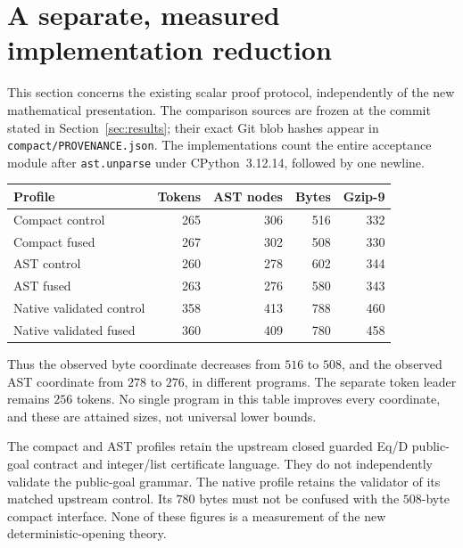 \section{A separate, measured implementation reduction}
\label{sec:continuation-fusion}

This section concerns the existing scalar proof protocol, independently of
the new mathematical presentation. The comparison sources are frozen at
the commit stated in Section~\ref{sec:results}; their exact Git blob hashes
appear in \texttt{compact/PROVENANCE.json}.
The implementations count the entire acceptance module after
\texttt{ast.unparse} under CPython~3.12.14, followed by one newline.

\begin{center}
\begin{tabular}{lrrrr}
\hline
Profile & Tokens & AST nodes & Bytes & Gzip-9\\
\hline
Compact control &265&306&516&332\\
Compact fused &267&302&508&330\\
AST control &260&278&602&344\\
AST fused &263&276&580&343\\
Native validated control &358&413&788&460\\
Native validated fused &360&409&780&458\\
\hline
\end{tabular}
\end{center}

Thus the observed byte coordinate decreases from $516$ to $508$, and the
observed AST coordinate from $278$ to $276$, in different programs. The
separate token leader remains $256$ tokens. No single program in this table
improves every coordinate, and these are attained sizes, not universal
lower bounds.

The compact and AST profiles retain the upstream closed guarded Eq/D
public-goal contract and integer/list certificate language. They do not
independently validate the public-goal grammar. The native profile retains
the validator of its matched upstream control. Its $780$ bytes must not be
confused with the $508$-byte compact interface. None of these figures is a
measurement of the new deterministic-opening theory.

